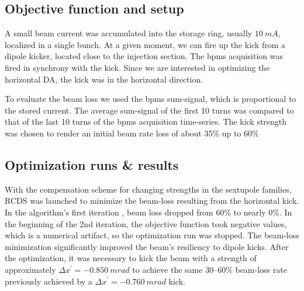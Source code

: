 \subsection{Objective function and setup}
A small beam current was accumulated into the storage ring, usually $10~\unit{mA}$, localized in a single bunch. At a given moment, we can fire up the kick from a dipole kicker, located close to the injection section. The \glspl*{bpm} acquisition was fired in synchrony with the kick. Since we are interested in optimizing the horizontal \gls*{DA}, the kick was in the horizontal direction.

To evaluate the beam loss we used the \glspl*{bpm} sum-signal, which is proportional to the stored current. The average sum-signal of the first 10 turns was compared to that of the last 10 turns of the \glspl*{bpm} acquisition time-series. The kick strength was chosen to render an initial beam rate loss of about 35\% up to 60\%
\subsection{Optimization runs \& results}
With the compensation scheme for changing strengths in the sextupole families, \gls*{RCDS} was launched to minimize the beam-loss resulting from the horizontal kick. In the algorithm's first iteration
, beam loss dropped from 60\% to nearly 0\%. In the beginning of the 2nd iteration, the objective function took negative values, which is a numerical artifact, so the optimization run was stopped. The beam-loss minimization significantly improved the beam's resiliency to dipole kicks. After the optimization, it was necessary to kick the beam with a strength of approximately $\Delta x^\prime=-0.850~\unit{m rad}$ to achieve the same  30--60\% beam-loss rate previously achieved by a $\Delta x^\prime=-0.760~\unit{m rad}$ kick.


